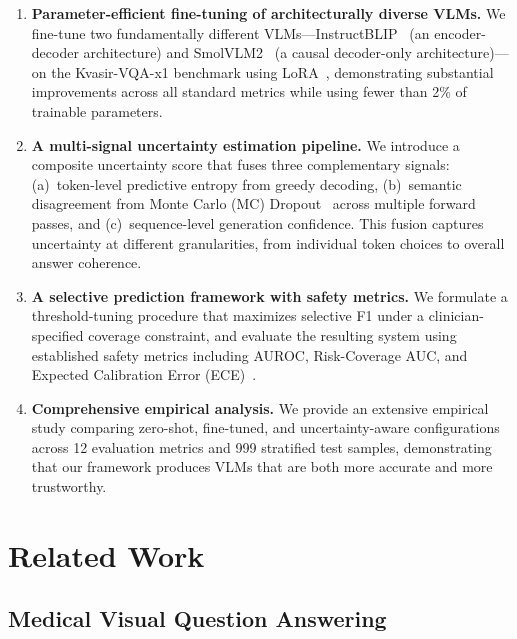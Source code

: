 \documentclass[pdflatex,sn-mathphys-num]{sn-jnl}
\begin{document}
\begin{enumerate}
    \item \textbf{Parameter-efficient fine-tuning of architecturally diverse VLMs.} We fine-tune two fundamentally different VLMs---InstructBLIP~\cite{dai2023instructblip} (an encoder-decoder architecture) and SmolVLM2~\cite{allal2025smolvlm} (a causal decoder-only architecture)---on the Kvasir-VQA-x1 benchmark using LoRA~\cite{hu2022lora}, demonstrating substantial improvements across all standard metrics while using fewer than 2\% of trainable parameters.

    \item \textbf{A multi-signal uncertainty estimation pipeline.} We introduce a composite uncertainty score that fuses three complementary signals: (a)~token-level predictive entropy from greedy decoding, (b)~semantic disagreement from Monte Carlo (MC) Dropout~\cite{gal2016dropout} across multiple forward passes, and (c)~sequence-level generation confidence. This fusion captures uncertainty at different granularities, from individual token choices to overall answer coherence.

    \item \textbf{A selective prediction framework with safety metrics.} We formulate a threshold-tuning procedure that maximizes selective F1 under a clinician-specified coverage constraint, and evaluate the resulting system using established safety metrics including AUROC, Risk-Coverage AUC, and Expected Calibration Error (ECE)~\cite{naeini2015ece,geifman2019selectivenet}.

    \item \textbf{Comprehensive empirical analysis.} We provide an extensive empirical study comparing zero-shot, fine-tuned, and uncertainty-aware configurations across 12 evaluation metrics and 999 stratified test samples, demonstrating that our framework produces VLMs that are both more accurate and more trustworthy.
\end{enumerate}

\section{Related Work}\label{sec:related}

\subsection{Medical Visual Question Answering}
\end{document}
